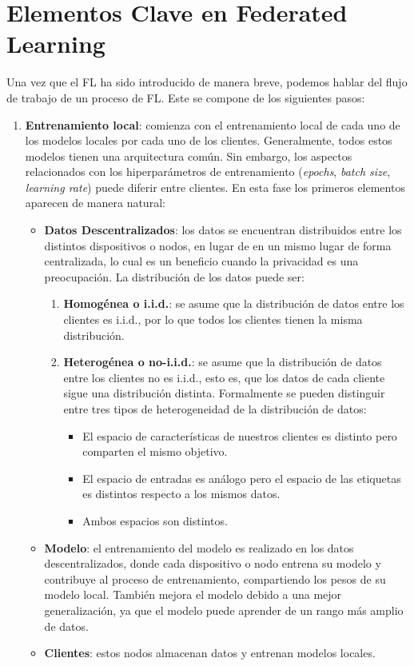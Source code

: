 \section{Elementos Clave en Federated Learning}
Una vez que el \ac{FL} ha sido introducido de manera breve, podemos hablar del flujo de trabajo de un proceso de \ac{FL}. Este se compone de los siguientes pasos:
\begin{enumerate}
    \item \textbf{Entrenamiento local}: comienza con el entrenamiento local de cada uno de los modelos locales por cada uno de los clientes. Generalmente, todos estos modelos tienen una arquitectura común. Sin embargo, los aspectos relacionados con los hiperparámetros de entrenamiento (\textit{epochs}, \textit{batch size}, \textit{learning rate}) puede diferir entre clientes. En esta fase los primeros elementos aparecen de manera natural:
    \begin{itemize}
        \item \textbf{Datos Descentralizados}: los datos se encuentran distribuidos entre los distintos dispositivos o nodos, en lugar de en un mismo lugar de forma centralizada, lo cual es un beneficio cuando la privacidad es una preocupación. La distribución de los datos puede ser:
        \begin{enumerate}
            \item \textbf{Homogénea o \ac{i.i.d.}}: se asume que la distribución de datos entre los clientes es \ac{i.i.d.}, por lo que todos los clientes tienen la misma distribución.
            \item \textbf{Heterogénea o no-i.i.d.}: se asume que la distribución de datos entre los clientes no es \ac{i.i.d.}, esto es, que los datos de cada cliente sigue una distribución distinta. Formalmente se pueden distinguir entre tres tipos de heterogeneidad de la distribución de datos:
            \begin{itemize}
                \item El espacio de características de nuestros clientes es distinto pero comparten el mismo objetivo.
                \item El espacio de entradas es análogo pero el espacio de las etiquetas es distintos respecto a los mismos datos.
                \item Ambos espacios son distintos.
            \end{itemize}
        \end{enumerate}

        \item \textbf{Modelo}: el entrenamiento del modelo es realizado en los datos descentralizados, donde cada dispositivo o nodo entrena su modelo y contribuye al proceso de entrenamiento, compartiendo los pesos de su modelo local. También mejora el modelo debido a una mejor generalización, ya que el modelo puede aprender de un rango más amplio de datos.
        \item \textbf{Clientes}: estos nodos almacenan datos y entrenan modelos locales.
    \end{itemize}
    

\end{enumerate}
